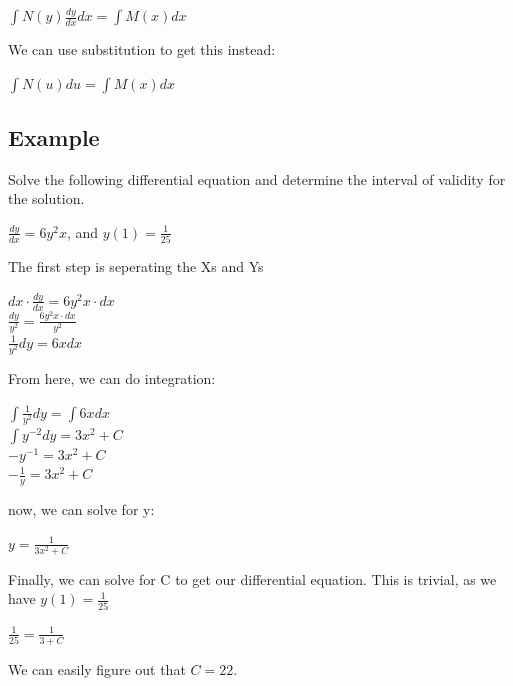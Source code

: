 \documentclass{article}
\begin{document}
\begin{center}
    $\int N(y) \frac{dy}{dx} dx = \int M(x) dx$
\end{center}

We can use substitution to get this instead:

\begin{center}
    $\int N(u) du = \int M(x) dx$
\end{center}

\subsection{Example}

Solve the following differential equation and determine the interval of validity for the solution.

\begin{center}
$\frac{dy}{dx} = 6y^2 x$, and $y(1) = \frac{1}{25}$
\end{center}

The first step is seperating the Xs and Ys

\begin{center}
    $dx \cdot \frac{dy}{dx} = 6y^2 x \cdot dx$ \\ 
    $\frac{dy}{y^2} = \frac{6y^2 x \cdot dx}{y^2}$ \\
    $\frac{1}{y^2} dy = 6x dx$
\end{center}

From here, we can do integration:

\begin{center}
    $\int \frac{1}{y^2} dy = \int 6x dx$ \\
    $\int y^{-2} dy = 3x^2 + C$ \\
    $-y^{-1} = 3x^2 + C$ \\
    $-\frac{1}{y} = 3x^2 + C$
\end{center}

now, we can solve for y:

\begin{center}
    $y = \frac{1}{3x^2 + C}$
\end{center}

Finally, we can solve for C to get our differential equation. This is trivial, as we have $y(1) = \frac{1}{25}$

\begin{center}
    $\frac{1}{25} = \frac{1}{3 + C}$
\end{center}

We can easily figure out that $C = 22$.
\end{document}
